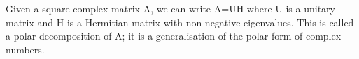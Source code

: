 Given a square complex matrix A, we can write A=UH where U is a unitary matrix and 
H is a Hermitian matrix with non-negative eigenvalues. This is called a polar
decomposition of A; it is a generalisation of the polar form of complex numbers.